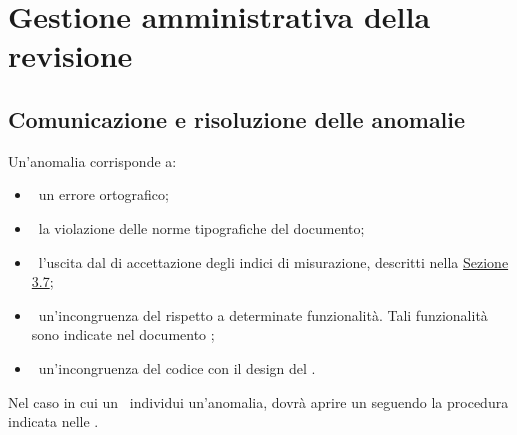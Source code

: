 
\section{Gestione amministrativa della revisione}
\label{sec:4}
	\subsection{Comunicazione e risoluzione delle anomalie}
	\label{sec:4.1}
		Un'anomalia corrisponde a:
		\begin{itemize}
			\item\ un errore ortografico;
			\item\ la violazione delle norme tipografiche del documento;
			\item\ l'uscita dal  di accettazione degli indici di misurazione, descritti nella \hyperref[sec:3.7]{Sezione 3.7};
			\item\ un'incongruenza del  rispetto a determinate funzionalità. Tali funzionalità sono indicate nel documento \ARdoc;
			\item\ un'incongruenza del codice con il design del .
		\end{itemize}
		Nel caso in cui un \VER\ individui un'anomalia, dovrà aprire un  seguendo la procedura indicata nelle \NPdoc.